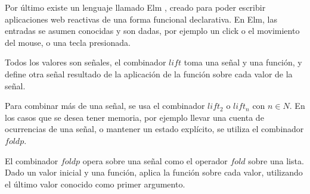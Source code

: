 

Por último existe un lenguaje llamado Elm \cite{evanczaplicki2012:Elm},
creado para poder escribir aplicaciones web reactivas
de una forma funcional declarativa.
  En Elm, las entradas se asumen conocidas y son dadas,
por ejemplo un click o el movimiento del mouse,
o una tecla presionada.

  Todos los valores son señales, el combinador $lift$
toma una señal y una función, y define otra señal resultado
de la aplicación de la función sobre cada valor de la señal.

  Para combinar más de una señal, se usa el combinador $lift_2$ o
$lift_n$ con $n \in N$.
  En los casos que se desea tener memoria, por ejemplo llevar una
cuenta de ocurrencias de una señal, o mantener un estado explícito,
se utiliza el combinador $foldp$.

  El combinador $foldp$ opera sobre una señal como el
operador $fold$ sobre una lista.
  Dado un valor inicial y una función, aplica la función sobre
cada valor, utilizando el último valor conocido como primer argumento.

